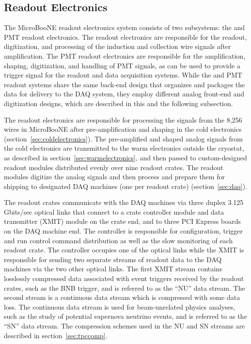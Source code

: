 \subsection{Readout Electronics}
\label{sec:readoutelectronics}
The MicroBooNE readout electronics system consists of two subsystems: the \lartpc and PMT readout electronics. The \lartpc readout electronics are responsible for the readout, digitization, and processing of the induction and collection wire signals after amplification. The PMT readout electronics are responsible for the amplification, shaping, digitization, and handling of PMT signals, as can be used to provide a trigger signal for the readout and data acquisition systems. While the \lartpc and PMT readout systems share the same back-end design that organizes and packages the data for delivery to the DAQ system, they employ different analog front-end and digitization designs, which are described in this and the following subsection.

The \lartpc readout electronics are responsible for processing the signals from the 8,256 wires in MicroBooNE after pre-amplification and shaping in the cold electronics (section~\ref{sec:coldelectronics}).  The pre-amplified and shaped analog signals from the cold electronics are transmitted to the warm electronics outside the cryostat, as described in section~\ref{sec:warmelectronics}, and then passed to custom-designed \lartpc readout modules distributed evenly over nine readout crates.  The readout modules digitize the analog signals and then process and prepare them for shipping to designated DAQ machines (one per readout crate) (section~\ref{sec:daq}). 

The \lartpc readout crates communicate with the DAQ machines via three duplex 3.125 Gbits/sec optical links that connect to a crate controller module and data transmitter (XMIT) module on the crate end, and to three PCI Express boards on the DAQ machine end. The controller is responsible for configuration, trigger and run control command distribution as well as the slow monitoring of each readout crate. The controller occupies one of the optical links while the XMIT is responsible for sending two separate streams of readout data to the DAQ machines via the two other optical links. The first XMIT stream contains losslessly compressed \lartpc data associated with event triggers received by the \lartpc readout crates, such as the BNB trigger, and is referred to as the ``NU'' data stream. The second stream is a continuous \lartpc data stream which is compressed with some data loss. The continuous data stream is used for beam-unrelated physics analyses, such as the study of potential supernova neutrino events, and is referred to as the ``SN'' data stream. The compression schemes used in the NU and SN streams are described in section~\ref{sec:tpccomp}.

